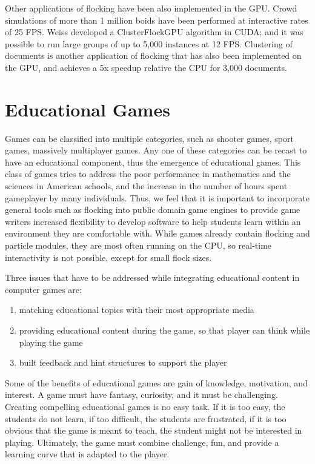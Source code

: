 Other applications of flocking have been also implemented in the GPU.  Crowd simulations of more than 1 million boids have been performed\cite{supermassiveCrowd} at interactive rates of 25 FPS. Weiss developed a ClusterFlockGPU algorithm\cite{SI_GPU} in CUDA; and it was possible to run large groups of up to 5,000 instances at 12 FPS. Clustering of documents is another application of flocking that has also been implemented on the GPU\cite{document2}, and achieves a 5x speedup relative the CPU for 3,000 documents. 

\section{Educational Games}
Games can be classified into multiple categories, such as shooter games, sport games, massively multiplayer games. Any one of these categories can be recast to have an educational component, thus the emergence of educational games. This class of games tries to address the poor performance in mathematics and the sciences in American schools, and the increase in the number of hours spent gameplayer by many individuals. Thus, we feel that it is important to incorporate general tools such as flocking into public domain game engines to provide game writers increased flexibility to develop software to help students learn within an environment they are comfortable with. While games already contain flocking and particle modules, they are most often running on the CPU, so real-time interactivity is not possible, except for small flock sizes. 


Three issues that have to be addressed while integrating educational content in computer games are\cite{educationalComputerGames}:
\begin{enumerate}
\item{matching educational topics with their most appropriate media}
\item{providing educational content during the game, so that player can think while playing 
the game}
\item{built feedback and hint structures to support the player} 
\end{enumerate} 
Some of the benefits of educational games are gain of knowledge, motivation, and interest. A game must have fantasy, curiosity, and it must be challenging\cite{computerGamesEducationalTool}. Creating compelling educational games is no easy task. If it is too easy, the students do not learn, if too difficult, the students are frustrated, if it is too obvious that the game is meant to teach, the student might not be interested in playing. Ultimately, the game must combine challenge, fun, and provide a learning curve that is adapted to the player.


